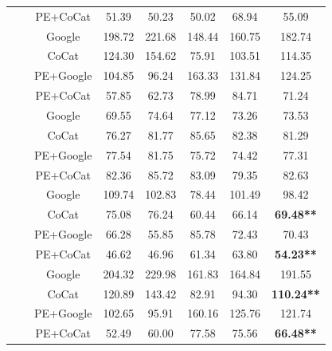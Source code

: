 \begin{table}[!t]
\begin{threeparttable}
\begin{tabular}{*{8}{|c}|}
			&                           &  PE+CoCat &  51.39 &  50.23 &  50.02 &  68.94 &  55.09 \\
			&    &    Google & 198.72 & 221.68 & 148.44 & 160.75 & 182.74 \\
			&                           &     CoCat & 124.30 & 154.62 &  75.91 & 103.51 & 114.35 \\
			&                           & PE+Google & 104.85 &  96.24 & 163.33 & 131.84 & 124.25 \\
			&                           &  PE+CoCat &  57.85 &  62.73 &  78.99 &  84.71 &  71.24 \\
			&  &    Google &  69.55 &  74.64 &  77.12 &  73.26 &  73.53 \\
			&                           &     CoCat &  76.27 &  81.77 &  85.65 &  82.38 &  81.29 \\
			&                           & PE+Google &  77.54 &  81.75 &  75.72 &  74.42 &  77.31 \\
			&                           &  PE+CoCat &  82.36 &  85.72 &  83.09 &  79.35 &  82.63\\
			& &    Google & 109.74 & 102.83 &  78.44 & 101.49 &  98.42 \\
			&                           &     CoCat &  75.08 &  76.24 &  60.44 &  66.14 &  \textbf{69.48**} \\
			&                           & PE+Google &  66.28 &  55.85 &  85.78 &  72.43 &  70.43 \\
			&                           &  PE+CoCat &  46.62 &  46.96 &  61.34 &  63.80 &  \textbf{54.23**} \\
			&    &    Google & 204.32 & 229.98 & 161.83 & 164.84 & 191.55 \\
			&                           &     CoCat & 120.89 & 143.42 &  82.91 &  94.30 & \textbf{110.24**} \\
			&                           & PE+Google & 102.65 &  95.91 & 160.16 & 125.76 & 121.74 \\
			&                           &  PE+CoCat &  52.49 &  60.00 &  77.58 &  75.56 &  \textbf{66.48**} \\

\end{tabular}
\end{threeparttable}
\end{table}

